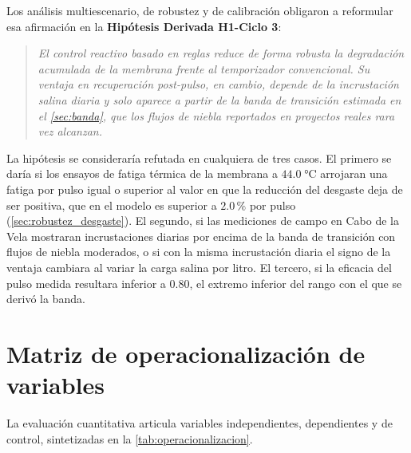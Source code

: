 Los an\'alisis multiescenario, de robustez y de calibraci\'on obligaron a reformular esa afirmaci\'on en la \textbf{Hip\'otesis Derivada H1-Ciclo 3}:
\begin{quote}
\itshape
El control reactivo basado en reglas reduce de forma robusta la degradaci\'on acumulada de la membrana frente al temporizador convencional. Su ventaja en recuperaci\'on post-pulso, en cambio, depende de la incrustaci\'on salina diaria y solo aparece a partir de la banda de transici\'on estimada en el \cref{sec:banda}, que los flujos de niebla reportados en proyectos reales rara vez alcanzan.
\end{quote}

La hip\'otesis se considerar\'ia refutada en cualquiera de tres casos. El primero se dar\'ia si los ensayos de fatiga t\'ermica de la membrana a $44.0\;\si{\celsius}$ arrojaran una fatiga por pulso igual o superior al valor en que la reducci\'on del desgaste deja de ser positiva, que en el modelo es superior a $2.0\,\%$ por pulso (\cref{sec:robustez_desgaste}). El segundo, si las mediciones de campo en Cabo de la Vela mostraran incrustaciones diarias por encima de la banda de transici\'on con flujos de niebla moderados, o si con la misma incrustaci\'on diaria el signo de la ventaja cambiara al variar la carga salina por litro. El tercero, si la eficacia del pulso medida resultara inferior a $0.80$, el extremo inferior del rango con el que se deriv\'o la banda.

\section{Matriz de operacionalizaci\'on de variables}
La evaluaci\'on cuantitativa articula variables independientes, dependientes y de control, sintetizadas en la \cref{tab:operacionalizacion}.

